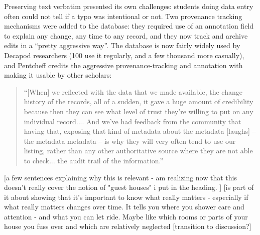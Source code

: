 Preserving text verbatim presented its own challenges: students doing data entry often could not tell if a typo was intentional or not. Two provenance tracking mechanisms were added to the database: they required use of an annotation field to explain any change, any time to any record, and they now track and archive edits in a “pretty aggressive way”. The database is now fairly widely used by Decapod researchers (100 use it regularly, and a few thousand more casually), and Pentcheff credits the aggressive provenance-tracking and annotation with making it usable by other scholars:
\begin{quote}
“[When] we reflected with the data that we made available, the change history of the records, all of a sudden, it gave a huge amount of credibility because then they can see what level of trust they're willing to put on any individual record.... And we've had feedback from the community that having that, exposing that kind of metadata about the metadata [laughs] – the metadata metadata – is why they will very often tend to use our listing, rather than any other authoritative source where they are not able to check... the audit trail of the information.”
\end{quote}


[a few sentences explaining why this is relevant - am realizing now that this doesn't really cover the notion of "guest houses" i put in the heading. ]
[is part of it about showing that it's important to know what really matters - especially if what really matters changes over time. It tells you where you shower care and attention - and what you can let ride. Maybe like which rooms or parts of your house you fuss over and which are relatively neglected
[transition to discussion?]

